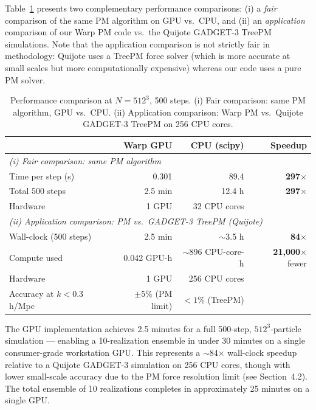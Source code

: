 \documentclass[]{article}
\begin{document}
Table~\ref{tab:speedup} presents two complementary performance comparisons: (i) a \textit{fair} comparison of the same PM algorithm on GPU vs.\ CPU, and (ii) an \textit{application} comparison of our Warp PM code vs.\ the Quijote GADGET-3 TreePM simulations. Note that the application comparison is not strictly fair in methodology: Quijote uses a TreePM force solver (which is more accurate at small scales but more computationally expensive) whereas our code uses a pure PM solver.

\begin{table}[h]
\centering
\caption{Performance comparison at $N=512^3$, 500 steps. (i) Fair comparison: same PM algorithm, GPU vs.\ CPU. (ii) Application comparison: Warp PM vs.\ Quijote GADGET-3 TreePM \citep{Springel2005} on 256 CPU cores.}
\label{tab:speedup}
\begin{tabular}{lrrr}
\hline
 & Warp GPU & CPU (scipy) & Speedup \\
\hline
\multicolumn{4}{l}{\textit{(i) Fair comparison: same PM algorithm}} \\
Time per step (s) & 0.301 & 89.4 & \textbf{297}$\times$ \\
Total 500 steps & 2.5 min & 12.4 h & \textbf{297}$\times$ \\
Hardware & 1 GPU & 32 CPU cores & \\
\hline
\multicolumn{4}{l}{\textit{(ii) Application comparison: PM vs.\ GADGET-3 TreePM (Quijote)}} \\
Wall-clock (500 steps) & 2.5 min & $\sim$3.5 h & \textbf{84}$\times$ \\
Compute used & 0.042 GPU-h & $\sim$896 CPU-core-h & \textbf{21{,}000}$\times$ fewer \\
Hardware & 1 GPU & 256 CPU cores & \\
Accuracy at $k<0.3$ h/Mpc & $\pm5\%$ (PM limit) & $<1\%$ (TreePM) & \\
\hline
\end{tabular}
\end{table}

The GPU implementation achieves 2.5 minutes for a full 500-step, $512^3$-particle simulation — enabling a 10-realization ensemble in under 30 minutes on a single consumer-grade workstation GPU. This represents a $\sim$84$\times$ wall-clock speedup relative to a Quijote GADGET-3 simulation on 256 CPU cores, though with lower small-scale accuracy due to the PM force resolution limit (see Section~4.2). The total ensemble of 10 realizations completes in approximately 25 minutes on a single GPU.
\end{document}

